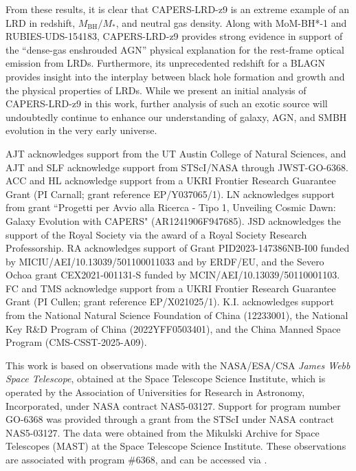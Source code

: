 \documentclass[twocolumn]{aastex7}
\newcommand{\src}{CAPERS-LRD-z9}
\begin{document}
From these results, it is clear that \src{} is an extreme example of an LRD in redshift, $M_\textrm{BH}/M_*$, and neutral gas density. Along with MoM-BH*-1 and RUBIES-UDS-154183, \src{} provides strong evidence in support of the ``dense-gas enshrouded AGN'' physical explanation for the rest-frame optical emission from LRDs. Furthermore, its unprecedented redshift for a BLAGN provides insight into the interplay between black hole formation and growth and the physical properties of LRDs. While we present an initial analysis of \src{} in this work, further analysis of such an exotic source will undoubtedly continue to enhance our understanding of galaxy, AGN, and SMBH evolution in the very early universe. 

\begin{acknowledgements}
AJT acknowledges support from the UT Austin College of Natural Sciences, and AJT and SLF acknowledge support from STScI/NASA through JWST-GO-6368. ACC and HL acknowledge support from a UKRI Frontier Research Guarantee Grant (PI Carnall; grant reference EP/Y037065/1). LN acknowledges support from grant ``Progetti per Avvio alla Ricerca - Tipo 1, Unveiling Cosmic Dawn: Galaxy Evolution with CAPERS" (AR1241906F947685). JSD acknowledges the support of the Royal Society via the award of a Royal Society Research Professorship. RA acknowledges support of Grant PID2023-147386NB-I00 funded by MICIU/AEI/10.13039/501100011033 and by ERDF/EU, and the Severo Ochoa grant CEX2021-001131-S funded by MCIN/AEI/10.13039/50110001103. FC and TMS acknowledge support from a UKRI Frontier Research Guarantee Grant (PI Cullen; grant reference EP/X021025/1). K.I. acknowledges support from the National Natural Science Foundation of China (12233001),  the National Key R\&D Program of China (2022YFF0503401), and the China Manned Space Program (CMS-CSST-2025-A09).

This work is based on observations made with the NASA/ESA/CSA \textit{James Webb Space Telescope}, obtained at the Space Telescope Science Institute, which is operated by the Association of Universities for Research in Astronomy, Incorporated, under NASA contract NAS5-03127. Support for program number GO-6368 was provided through a grant from the STScI under NASA contract NAS5-03127. The data were obtained from the Mikulski Archive for Space Telescopes (MAST) at the Space Telescope Science Institute. 
These observations are associated with program \#6368, and can be accessed via .


\end{acknowledgements}
\end{document}
